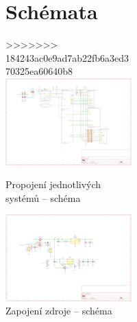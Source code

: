 \begin{figure}
\begin{figure}
\begin{figure}
\begin{figure}
    \section{Schémata}
>>>>>>> 184243ac0e9ad7ab22fb6a3ed370325ea60640b8
    \centering
    \includegraphics[width=0.93\textheight, angle=90]{kapitoly/ctvrta_elektronicka_varianta/E4_zapojeni/B.B.pdf}
    \caption{Propojení jednotlivých systémů -- schéma}
    \label{fig:E4-sch_B.B}
\end{figure}
\begin{figure}
    \centering
    \includegraphics[width=0.93\textheight, angle=90]{kapitoly/ctvrta_elektronicka_varianta/E4_zapojeni/zdroj.pdf}
    \caption{Zapojení zdroje -- schéma}
    \label{fig:E4-sch_zdroj}
\end{figure}
\begin{figure}
    \centering

\end{figure}
\end{figure}
\end{figure}
\end{figure}

